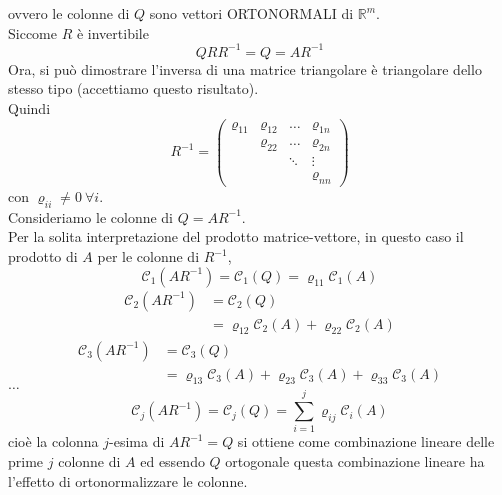 \documentclass[12pt,a4paper]{article}
\begin{document}
ovvero le colonne di $Q$ sono vettori ORTONORMALI di $\mathbb{R}^m$. \\
Siccome $R$ è invertibile 
\begin{equation*}
    QRR^{-1} = Q = AR^{-1}
\end{equation*}
Ora, si può dimostrare l'inversa di una matrice triangolare è triangolare dello stesso tipo (accettiamo questo risultato). \\
Quindi
\begin{equation*}
    R^{-1}=\begin{pmatrix}
         \varrho_{11} & \varrho_{12} & \dots & \varrho_{1n} \\
          & \varrho_{22} & \dots & \varrho_{2n} \\
          & & \ddots & \vdots \\
          & & & \varrho_{nn} 
    \end{pmatrix}
\end{equation*}
con $\varrho_{ii}\neq 0 \ \forall i$.\\
Consideriamo le colonne di $Q=AR^{-1}$. \\
Per la solita interpretazione del prodotto matrice-vettore, in questo caso il prodotto di $A$ per le colonne di $R^{-1}$,
\begin{equation*}
    \mathcal{C}_1(AR^{-1})=\mathcal{C}_1(Q)=\varrho_{11}\mathcal{C}_1(A)
\end{equation*}
\begin{equation*}
    \begin{split}
        \mathcal{C}_2(AR^{-1})& =\mathcal{C}_2(Q)\\
        &=\varrho_{12}\mathcal{C}_2(A) + \varrho_{22}\mathcal{C}_2(A)
    \end{split}
\end{equation*}
\begin{equation*}
    \begin{split}
        \mathcal{C}_3(AR^{-1})& =\mathcal{C}_3(Q)\\
        &=\varrho_{13}\mathcal{C}_3(A) + \varrho_{23}\mathcal{C}_3(A) + \varrho_{33}\mathcal{C}_3(A)
    \end{split}
\end{equation*}
$\dots$
\begin{equation*}
    \mathcal{C}_j(AR^{-1})=\mathcal{C}_j(Q)=\sum_{i=1}^j\varrho_{ij}\mathcal{C}_i(A)
\end{equation*}
cioè la colonna $j$-esima di $AR^{-1}=Q$ si ottiene come combinazione lineare delle prime $j$ colonne di $A$ ed essendo $Q$ ortogonale questa combinazione lineare ha l'effetto di ortonormalizzare le colonne.\\
\end{document}
